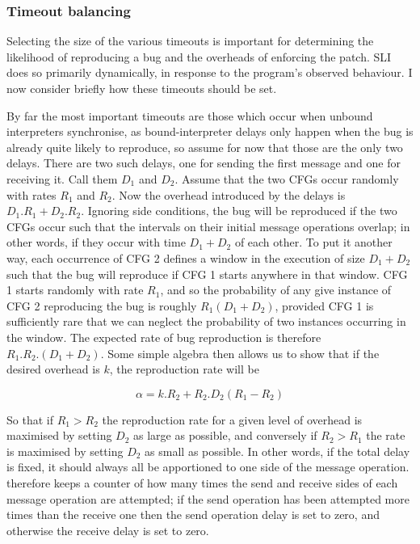 \subsubsection{Timeout balancing}
\label{sect:using:timeout_balancing}

Selecting the size of the various timeouts is important for
determining the likelihood of reproducing a bug and the overheads of
enforcing the patch.  SLI does so primarily dynamically, in response
to the program's observed behaviour.  I now consider briefly how these
timeouts should be set.

By far the most important timeouts are those which occur when unbound
interpreters synchronise, as bound-interpreter delays only happen when
the bug is already quite likely to reproduce, so assume for now that
those are the only two delays.  There are two such delays, one for
sending the first message and one for receiving it.  Call them $D_1$
and $D_2$.  Assume that the two CFGs occur randomly with rates $R_1$
and $R_2$.  Now the overhead introduced by the delays is $D_1.R_1 +
D_2.R_2$.  Ignoring side conditions, the bug will be reproduced if the
two CFGs occur such that the intervals on their initial message
operations overlap; in other words, if they occur with time $D_1 +
D_2$ of each other.  To put it another way, each occurrence of CFG 2
defines a window in the execution of size $D_1 + D_2$ such that the
bug will reproduce if CFG 1 starts anywhere in that window.  CFG 1
starts randomly with rate $R_1$, and so the probability of any give
instance of CFG 2 reproducing the bug is roughly $R_1(D_1 + D_2)$,
provided CFG 1 is sufficiently rare that we can neglect the
probability of two instances occurring in the window.  The expected
rate of bug reproduction is therefore $R_1.R_2.(D_1+D_2)$.  Some
simple algebra then allows us to show that if the desired overhead is
$k$, the reproduction rate will be

\begin{displaymath}
\alpha = k.R_2 + R_2.D_2(R_1 - R_2)
\end{displaymath}

So that if $R_1 > R_2$ the reproduction rate for a given level of
overhead is maximised by setting $D_2$ as large as possible, and
conversely if $R_2 > R_1$ the rate is maximised by setting $D_2$ as
small as possible.  In other words, if the total delay is fixed, it
should always all be apportioned to one side of the message operation.
{\Implementation} therefore keeps a counter of how many times the send
and receive sides of each message operation are attempted; if the send
operation has been attempted more times than the receive one then the
send operation delay is set to zero, and otherwise the receive delay
is set to zero.

